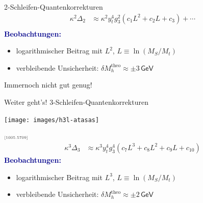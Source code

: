 \documentclass[hyperref={pdfpagelabels=false},ngerman]{beamer}
\newcommand{\eh}[1]{\,\mathsf{#1}}
\newcommand{\MS}{\ensuremath{M_S}}
\newcommand{\mycite}[1]{\ensuremath{\text{\textcolor{darkgray}{\tiny [#1]}}}}
\renewcommand{\emph}[1]{\textbf{\textcolor{darkblue}{#1}}}
\newcommand{\GeV}{\eh{GeV}}
\begin{document}
\begin{frame}{2-Schleifen-Quantenkorrekturen}
  \begin{align*}
    \kappa^2\Delta_2 &\approx
    \kappa^2 y_t^4 g_3^2 \left(
      c_1 L^2
      + c_2 L
      + c_3
    \right) + \cdots \\
  \end{align*}
  \emph{Beobachtungen:}
  \begin{itemize}
  \item logarithmischer Beitrag mit $L^2$, $L\equiv\ln(\MS / M_t)$
  \item verbleibende Unsicherheit: $\delta M_h^{\text{theo}} \approx \pm 3 \GeV$
  \end{itemize}
  \vspace*{1em}
  Immernoch nicht gut genug!
\end{frame}

\begin{frame}{Weiter geht's! 3-Schleifen-Quantenkorrekturen}
  \begin{center}
    \texttt{[image: images/h3l-atasas]}
  \end{center}
  \mycite{1005.5709}
  \begin{align*}
    \kappa^3\Delta_3 &\approx
    \kappa^3 y_t^4 g_3^4 \left(
      c_7 L^3
      + c_8 L^2
      + c_9 L
      + c_{10}
    \right)
  \end{align*}
  \emph{Beobachtungen:}
  \begin{itemize}
  \item logarithmischer Beitrag mit $L^3$, $L\equiv\ln(\MS / M_t)$
  \item verbleibende Unsicherheit: $\delta M_h^{\text{theo}} \approx \pm 2 \GeV$
  \end{itemize}
\end{frame}
\end{document}
